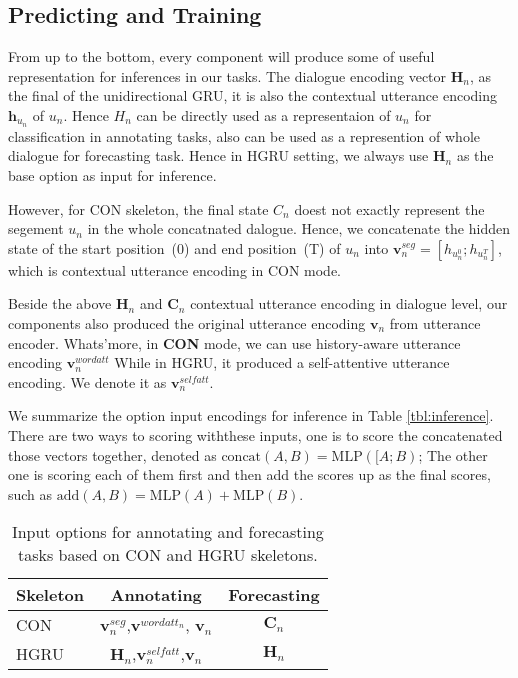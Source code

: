 
\subsection{Predicting and Training}
\label{ssec:inference_and_training}

 From up to the bottom, every component will
produce some of useful representation for inferences in our tasks.
The dialogue encoding vector $\bm{H}_{n}$, as the final of the
unidirectional GRU, it is also the contextual utterance encoding
$\bm{h}_{u_{n}}$ of $u_{n}$. Hence $H_{n}$ can be directly used as a
representaion of $u_{n}$ for classification in annotating tasks, also
can be used as a represention of whole dialogue for forecasting
task. Hence in HGRU setting, we always use $\bm{H}_{n}$ as the base
option as input for inference.

However, for CON skeleton, the final state $C_{n}$ doest not exactly
represent the segement $u_{n}$ in the whole concatnated
dalogue. Hence, we concatenate the hidden state of the start
position~(0) and end position~(T) of $u_{n}$ into
$\bm{v}^{seg}_{n}=[h_{u^{0}_{n}};h_{u^{T}_{n}}]$, which is contextual
utterance encoding in CON mode.

Beside the above $\bm{H}_{n}$ and $\bm{C}_{n}$ contextual utterance
encoding in dialogue level, our components also produced the original
utterance encoding $\bm{v}_{n}$ from utterance encoder.  Whats'more,
in \textbf{CON} mode, we can use history-aware utterance encoding $\bm{v}^{wordatt}_{n}$
While in HGRU, it produced a self-attentive utterance encoding. We
denote it as $\bm{v}^{selfatt}_{n}$.

We summarize the option input encodings for inference in Table \ref{tbl:inference}. There are two ways to scoring withthese inputs, one is to score the concatenated those vectors together, denoted as $\text{concat}(A, B)=\text{MLP}([A;B)$; The other one is scoring each of them first and then add the scores up as the final scores, such as $\text{add}(A,B)=\text{MLP}(A)+\text{MLP}(B)$.


\begin{table}[t]
\begin{center}
\setlength{\tabcolsep}{3pt}
\begin{tabular}{lcc}
\toprule
Skeleton & Annotating                                                & Forecasting  \\ \hline \hline
CON      & $\bm{v}^{seg}_{n}$,$\bm{v}^{{wordatt}_{n}}$, $\bm{v}_{n}$ & $\bm{C}_{n}$ \\ \hline
HGRU     & $\bm{H}_{n}$,$\bm{v}^{selfatt}_{n}$,$\bm{v}_{n}$          & $\bm{H}_{n}$ \\ \bottomrule
\end{tabular}
\end{center}
\caption{\label{tbl:inference_options} Input options for annotating and forecasting tasks based on CON and HGRU skeletons.}

\end{table}


